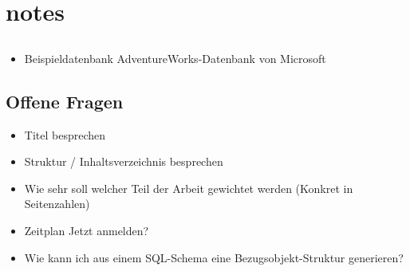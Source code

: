 \chapter{notes}
\section{}
\begin{itemize}
\item Beispieldatenbank AdventureWorks-Datenbank von Microsoft
\end{itemize}


\section{Offene Fragen}
\begin{itemize}
  \item Titel besprechen
  \item Struktur / Inhaltsverzeichnis besprechen
  \item Wie sehr soll welcher Teil der Arbeit gewichtet werden (Konkret in Seitenzahlen)
  \item Zeitplan Jetzt anmelden?
  \item Wie kann ich aus einem SQL-Schema eine Bezugsobjekt-Struktur generieren?
\end{itemize}
